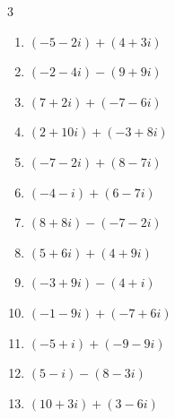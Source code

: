 \begin{multicols}{3}
\begin{enumerate}
        \phantom{$\displaystyle =2-15i$}

  \item $\displaystyle (-5-2i) + (4+3i)$

        \phantom{$\displaystyle =-1+i$}

  \item $\displaystyle (-2-4i) - (9+9i)$

        \phantom{$\displaystyle =-11-13i$}

  \item $\displaystyle (7+2i) + (-7-6i)$

        \phantom{$\displaystyle =-4i$}

\columnbreak %

  \item $\displaystyle (2+10i) + (-3+8i)$

        \phantom{$\displaystyle =-1+18i$}

  \item $\displaystyle (-7-2i) + (8-7i)$

        \phantom{$\displaystyle =1-9i$}

  \item $\displaystyle (-4-i) + (6-7i)$

        \phantom{$\displaystyle =2-8i$}

  \item $\displaystyle (8+8i) - (-7-2i)$

        \phantom{$\displaystyle =15+10i$}

  \item $\displaystyle (5+6i) + (4+9i)$

        \phantom{$\displaystyle =9+15i$}

  \item $\displaystyle (-3+9i) - (4+i)$

        \phantom{$\displaystyle =-7+8i$}

  \item $\displaystyle (-1-9i) + (-7+6i)$

        \phantom{$\displaystyle =-8-3i$}

  \item $\displaystyle (-5+i) + (-9-9i)$

        \phantom{$\displaystyle =-14-8i$}

  \item $\displaystyle (5-i) - (8-3i)$

        \phantom{$\displaystyle =-3+2i$}

  \item $\displaystyle (10+3i) + (3-6i)$


\end{enumerate}
\end{multicols}
